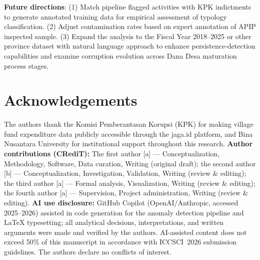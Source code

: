 \documentclass[3p,times,procedia]{elsarticle}
\begin{document}
\textbf{Future directions}: (1) Match pipeline flagged activities with KPK indictments to generate annotated training data for empirical assessment of typology classification. (2) Adjust contamination rates based on expert annotation of APIP inspected sample. (3) Expand the analysis to the Fiscal Year 2018–2025 or other province dataset with natural language approach to enhance persistence-detection capabilities and examine corruption evolution across Dana Desa maturation process stages.

\section*{Acknowledgements}

The authors thank the Komisi Pemberantasan Korupsi (KPK) for making village fund expenditure data publicly accessible through the jaga.id platform, and Bina Nusantara University for institutional support throughout this research. \textbf{Author contributions (CRediT):} The first author [a] — Conceptualization, Methodology, Software, Data curation, Writing (original draft); the second author [b] — Conceptualization, Investigation, Validation, Writing (review \& editing); the third author [a] — Formal analysis, Visualization, Writing (review \& editing); the fourth author [a] — Supervision, Project administration, Writing (review \& editing). \textbf{AI use disclosure:} GitHub Copilot (OpenAI/Anthropic, accessed 2025--2026) assisted in code generation for the anomaly detection pipeline and LaTeX typesetting; all analytical decisions, interpretations, and written arguments were made and verified by the authors. AI-assisted content does not exceed 50\% of this manuscript in accordance with ICCSCI~2026 submission guidelines. The authors declare no conflicts of interest.
\end{document}
